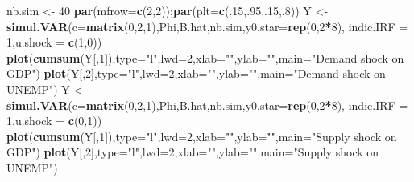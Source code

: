 \documentclass[
  12pt,
]{book}
\newenvironment{Shaded}{\begin{snugshade}}{\end{snugshade}}
\newcommand{\AttributeTok}[1]{\textcolor[rgb]{0.13,0.29,0.53}{#1}}
\newcommand{\DecValTok}[1]{\textcolor[rgb]{0.00,0.00,0.81}{#1}}
\newcommand{\FunctionTok}[1]{\textcolor[rgb]{0.13,0.29,0.53}{\textbf{#1}}}
\newcommand{\NormalTok}[1]{#1}
\newcommand{\OtherTok}[1]{\textcolor[rgb]{0.56,0.35,0.01}{#1}}
\newcommand{\SpecialCharTok}[1]{\textcolor[rgb]{0.81,0.36,0.00}{\textbf{#1}}}
\newcommand{\StringTok}[1]{\textcolor[rgb]{0.31,0.60,0.02}{#1}}
\theoremstyle{definition}
\theoremstyle{definition}
\theoremstyle{definition}
\theoremstyle{definition}
\theoremstyle{remark}
\begin{document}
\begin{Shaded}
\begin{Highlighting}[]
\NormalTok{nb.sim }\OtherTok{\textless{}{-}} \DecValTok{40}
\FunctionTok{par}\NormalTok{(}\AttributeTok{mfrow=}\FunctionTok{c}\NormalTok{(}\DecValTok{2}\NormalTok{,}\DecValTok{2}\NormalTok{));}\FunctionTok{par}\NormalTok{(}\AttributeTok{plt=}\FunctionTok{c}\NormalTok{(.}\DecValTok{15}\NormalTok{,.}\DecValTok{95}\NormalTok{,.}\DecValTok{15}\NormalTok{,.}\DecValTok{8}\NormalTok{))}
\NormalTok{Y }\OtherTok{\textless{}{-}} \FunctionTok{simul.VAR}\NormalTok{(}\AttributeTok{c=}\FunctionTok{matrix}\NormalTok{(}\DecValTok{0}\NormalTok{,}\DecValTok{2}\NormalTok{,}\DecValTok{1}\NormalTok{),Phi,B.hat,nb.sim,}\AttributeTok{y0.star=}\FunctionTok{rep}\NormalTok{(}\DecValTok{0}\NormalTok{,}\DecValTok{2}\SpecialCharTok{*}\DecValTok{8}\NormalTok{),}
               \AttributeTok{indic.IRF =} \DecValTok{1}\NormalTok{,}\AttributeTok{u.shock =} \FunctionTok{c}\NormalTok{(}\DecValTok{1}\NormalTok{,}\DecValTok{0}\NormalTok{))}
\FunctionTok{plot}\NormalTok{(}\FunctionTok{cumsum}\NormalTok{(Y[,}\DecValTok{1}\NormalTok{]),}\AttributeTok{type=}\StringTok{"l"}\NormalTok{,}\AttributeTok{lwd=}\DecValTok{2}\NormalTok{,}\AttributeTok{xlab=}\StringTok{""}\NormalTok{,}\AttributeTok{ylab=}\StringTok{""}\NormalTok{,}\AttributeTok{main=}\StringTok{"Demand shock on GDP"}\NormalTok{)}
\FunctionTok{plot}\NormalTok{(Y[,}\DecValTok{2}\NormalTok{],}\AttributeTok{type=}\StringTok{"l"}\NormalTok{,}\AttributeTok{lwd=}\DecValTok{2}\NormalTok{,}\AttributeTok{xlab=}\StringTok{""}\NormalTok{,}\AttributeTok{ylab=}\StringTok{""}\NormalTok{,}\AttributeTok{main=}\StringTok{"Demand shock on UNEMP"}\NormalTok{)}
\NormalTok{Y }\OtherTok{\textless{}{-}} \FunctionTok{simul.VAR}\NormalTok{(}\AttributeTok{c=}\FunctionTok{matrix}\NormalTok{(}\DecValTok{0}\NormalTok{,}\DecValTok{2}\NormalTok{,}\DecValTok{1}\NormalTok{),Phi,B.hat,nb.sim,}\AttributeTok{y0.star=}\FunctionTok{rep}\NormalTok{(}\DecValTok{0}\NormalTok{,}\DecValTok{2}\SpecialCharTok{*}\DecValTok{8}\NormalTok{),}
               \AttributeTok{indic.IRF =} \DecValTok{1}\NormalTok{,}\AttributeTok{u.shock =} \FunctionTok{c}\NormalTok{(}\DecValTok{0}\NormalTok{,}\DecValTok{1}\NormalTok{))}
\FunctionTok{plot}\NormalTok{(}\FunctionTok{cumsum}\NormalTok{(Y[,}\DecValTok{1}\NormalTok{]),}\AttributeTok{type=}\StringTok{"l"}\NormalTok{,}\AttributeTok{lwd=}\DecValTok{2}\NormalTok{,}\AttributeTok{xlab=}\StringTok{""}\NormalTok{,}\AttributeTok{ylab=}\StringTok{""}\NormalTok{,}\AttributeTok{main=}\StringTok{"Supply shock on GDP"}\NormalTok{)}
\FunctionTok{plot}\NormalTok{(Y[,}\DecValTok{2}\NormalTok{],}\AttributeTok{type=}\StringTok{"l"}\NormalTok{,}\AttributeTok{lwd=}\DecValTok{2}\NormalTok{,}\AttributeTok{xlab=}\StringTok{""}\NormalTok{,}\AttributeTok{ylab=}\StringTok{""}\NormalTok{,}\AttributeTok{main=}\StringTok{"Supply shock on UNEMP"}\NormalTok{)}
\end{Highlighting}
\end{Shaded}
\end{document}
